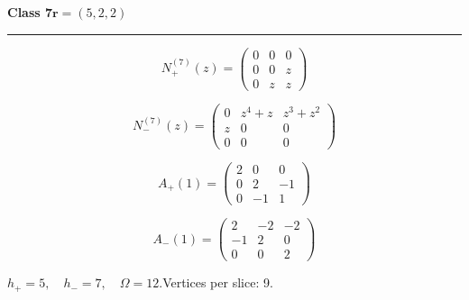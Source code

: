 \noindent\begin{minipage}{\linewidth}
\noindent\textbf{Class 7}\hfill $\symbf{r}=(5,2,2)$
\par\smallskip\noindent\textcolor{rulegray}{\rule{\linewidth}{0.3pt}}
\begin{minipage}[c]{0.495\linewidth}\centering\fontsize{10.5}{13}\selectfont
\setlength{\abovedisplayskip}{3pt}\setlength{\belowdisplayskip}{3pt}
\setlength{\abovedisplayshortskip}{3pt}\setlength{\belowdisplayshortskip}{3pt}
\setlength{\arraycolsep}{3.5pt}\renewcommand{\arraystretch}{1.18}
\[N_{+}^{(7)}(z)=\begin{pmatrix}0 & 0 & 0\\0 & 0 & z\\0 & z & z\end{pmatrix}\]
\end{minipage}%
\begin{minipage}[c]{0.495\linewidth}\centering\fontsize{10.5}{13}\selectfont
\setlength{\abovedisplayskip}{3pt}\setlength{\belowdisplayskip}{3pt}
\setlength{\abovedisplayshortskip}{3pt}\setlength{\belowdisplayshortskip}{3pt}
\setlength{\arraycolsep}{3.5pt}\renewcommand{\arraystretch}{1.18}
\[N_{-}^{(7)}(z)=\begin{pmatrix}0 & z^{4} + z & z^{3} + z^{2}\\z & 0 & 0\\0 & 0 & 0\end{pmatrix}\]
\end{minipage}%
\par\noindent
\begin{minipage}[c]{0.495\linewidth}\centering\fontsize{10.5}{13}\selectfont
\setlength{\abovedisplayskip}{3pt}\setlength{\belowdisplayskip}{3pt}
\setlength{\abovedisplayshortskip}{3pt}\setlength{\belowdisplayshortskip}{3pt}
\setlength{\arraycolsep}{3.5pt}\renewcommand{\arraystretch}{1.18}
\[A_{+}(1)=\begin{pmatrix}2 & 0 & 0\\0 & 2 & -1\\0 & -1 & 1\end{pmatrix}\]
\end{minipage}%
\begin{minipage}[c]{0.495\linewidth}\centering\fontsize{10.5}{13}\selectfont
\setlength{\abovedisplayskip}{3pt}\setlength{\belowdisplayskip}{3pt}
\setlength{\abovedisplayshortskip}{3pt}\setlength{\belowdisplayshortskip}{3pt}
\setlength{\arraycolsep}{3.5pt}\renewcommand{\arraystretch}{1.18}
\[A_{-}(1)=\begin{pmatrix}2 & -2 & -2\\-1 & 2 & 0\\0 & 0 & 2\end{pmatrix}\]
\end{minipage}%
\par\smallskip\noindent\small $h_+=5,\quad h_-=7,\quad \Omega=12.$\quad Vertices per slice: 9.
\end{minipage}\par\vfill
